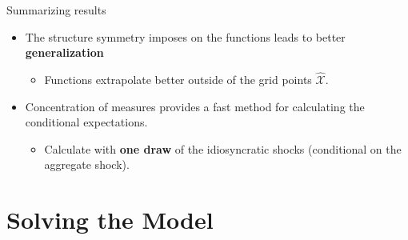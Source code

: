 \documentclass[aspectratio=169,10pt]{beamer}
\newcommand{\emphcolor}[1]{\textbf{\textcolor{emphcolorval}{#1}}}
\newcommand{\Xtrain}{\hat{\mathcal{X}}}
\begin{document}
\begin{frame}{Summarizing results}
	\begin{itemize}
		\item The structure symmetry imposes on the functions leads to better \emphcolor{generalization}\vspace{0.1in}
		\begin{itemize}
			\item Functions extrapolate better outside of the grid points $\Xtrain$.
		\end{itemize} \vspace{0.1in}
		\item Concentration of measures provides a fast method for calculating the conditional expectations. \vspace{0.1in}
		\begin{itemize}
			\item Calculate with \emphcolor{one draw} of the idiosyncratic shocks (conditional on the aggregate shock).\vspace{0.1in}
		\end{itemize} 
	\end{itemize}
\end{frame}
\section{Solving the Model}
	
	
	
	
	
\end{document}
